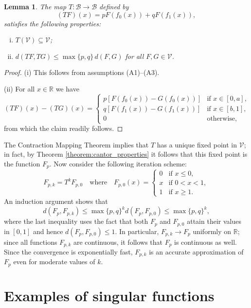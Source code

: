 \documentclass[a4paper,12pt]{article}
\newtheorem{lemma}{Lemma}[section]
\begin{document}
\begin{lemma}
The map $T : \mathcal{B} \to \mathcal{B}$ defined by
\[
(TF)(x) = pF(f_0(x)) + qF(f_1(x)),
\]
satisfies the following properties:
\begin{enumerate}[(i)]
\item $T(\mathcal{V}) \subseteq \mathcal{V}$;
\item $d(TF, TG) \leq \max\{p,q\}\,d(F,G)$ for all $F, G \in \mathcal{V}$.
\end{enumerate}
\end{lemma}

\begin{proof}
(i) This follows from assumptions (A1)--(A3).

(ii) For all $x \in \mathbb{R}$ we have
\[
(TF)(x)-(TG)(x) = 
\begin{cases}
p[F(f_0(x))-G(f_0(x))]	& \text{if } x \in [0,a], \\
q[F(f_1(x))-G(f_1(x))]	& \text{if } x \in [b,1], \\
0									& \text{otherwise},
\end{cases}
\]
from which the claim readily follows.
\end{proof}

The Contraction Mapping Theorem implies that $T$ has a unique fixed point in $\mathcal{V}$; in fact, by Theorem \ref{theorem:cantor_properties} it follows that this fixed point is the function $F_p$. Now consider the following iteration scheme:
\[
F_{p,k} = T^k F_{p,0}
\quad\text{where}\quad
F_{p,0}(x) = 
\begin{cases}
0 & \text{if } x \leq 0, \\
x & \text{if } 0 < x < 1, \\
1 & \text{if } x \geq 1.
\end{cases}
\]
An induction argument shows that
\[
d(F_p, F_{p,k}) \leq \max\{p,q\}^k d(F_p, F_{p,0}) \leq \max\{p,q\}^k,
\]
where the last inequality uses the fact that both $F_p$ and $F_{p,0}$ attain their values in $[0,1]$ and hence $d(F_p,F_{p,0}) \leq 1$. In particular, $F_{p,k} \to F_p$ uniformly on $\mathbb{R}$; since all functions $F_{p,k}$ are continuous, it follows that $F_p$ is continuous as well. Since the convergence is exponentially fast, $F_{p,k}$ is an accurate approximation of $F_p$ even for moderate values of $k$.


\newpage

\section{Examples of singular functions}
\label{sec:cantor}
\end{document}
